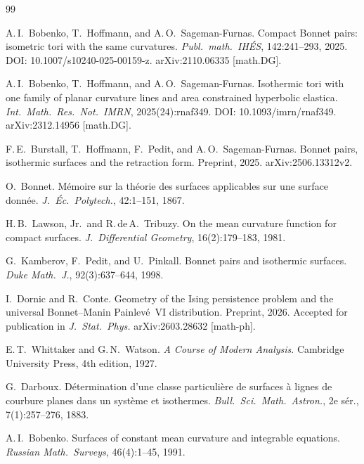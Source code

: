 \documentclass[11pt,a4paper]{article}
\theoremstyle{plain}
\theoremstyle{definition}
\theoremstyle{remark}
\begin{document}
\begin{thebibliography}{99}

A.\,I.~Bobenko, T.~Hoffmann, and A.\,O.~Sageman-Furnas.
\newblock Compact Bonnet pairs: isometric tori with the same curvatures.
\newblock \emph{Publ.\ math.\ IH\'ES}, 142:241--293, 2025.
\newblock DOI: 10.1007/s10240-025-00159-z.
\newblock arXiv:2110.06335 [math.DG].

A.\,I.~Bobenko, T.~Hoffmann, and A.\,O.~Sageman-Furnas.
\newblock Isothermic tori with one family of planar curvature lines and area
  constrained hyperbolic elastica.
\newblock \emph{Int.\ Math.\ Res.\ Not.\ IMRN}, 2025(24):rnaf349.
\newblock DOI: 10.1093/imrn/rnaf349.
\newblock arXiv:2312.14956 [math.DG].

F.\,E.~Burstall, T.~Hoffmann, F.~Pedit, and A.\,O.~Sageman-Furnas.
\newblock Bonnet pairs, isothermic surfaces and the retraction form.
\newblock Preprint, 2025.
\newblock arXiv:2506.13312v2.

O.~Bonnet.
\newblock M\'emoire sur la th\'eorie des surfaces applicables sur une
  surface donn\'ee.
\newblock \emph{J.\ \'Ec.\ Polytech.}, 42:1--151, 1867.

H.\,B.~Lawson, Jr.\ and R.\,de\,A.~Tribuzy.
\newblock On the mean curvature function for compact surfaces.
\newblock \emph{J.\ Differential Geometry}, 16(2):179--183, 1981.

G.~Kamberov, F.~Pedit, and U.~Pinkall.
\newblock Bonnet pairs and isothermic surfaces.
\newblock \emph{Duke Math.\ J.}, 92(3):637--644, 1998.

I.~Dornic and R.~Conte.
\newblock Geometry of the Ising persistence problem and the universal
  Bonnet--Manin Painlev\'e~VI distribution.
\newblock Preprint, 2026. Accepted for publication in
  \emph{J.\ Stat.\ Phys.}
\newblock arXiv:2603.28632 [math-ph].

E.\,T.~Whittaker and G.\,N.~Watson.
\newblock \emph{A Course of Modern Analysis}.
\newblock Cambridge University Press, 4th edition, 1927.

G.~Darboux.
\newblock D\'etermination d'une classe particuli\`ere de surfaces \`a
  lignes de courbure planes dans un syst\`eme et isothermes.
\newblock \emph{Bull.\ Sci.\ Math.\ Astron.}, 2e s\'er., 7(1):257--276,
  1883.

A.\,I.~Bobenko.
\newblock Surfaces of constant mean curvature and integrable equations.
\newblock \emph{Russian Math.\ Surveys}, 46(4):1--45, 1991.


\end{thebibliography}
\end{document}
